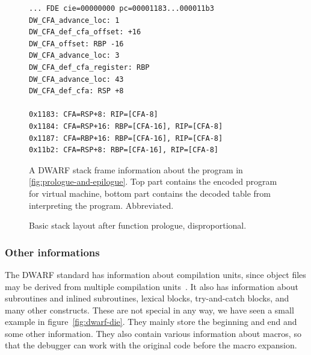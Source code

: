 \begin{figure}
    \begin{lstlisting}
... FDE cie=00000000 pc=00001183...000011b3
DW_CFA_advance_loc: 1
DW_CFA_def_cfa_offset: +16
DW_CFA_offset: RBP -16
DW_CFA_advance_loc: 3
DW_CFA_def_cfa_register: RBP
DW_CFA_advance_loc: 43
DW_CFA_def_cfa: RSP +8

0x1183: CFA=RSP+8: RIP=[CFA-8]
0x1184: CFA=RSP+16: RBP=[CFA-16], RIP=[CFA-8]
0x1187: CFA=RBP+16: RBP=[CFA-16], RIP=[CFA-8]
0x11b2: CFA=RSP+8: RBP=[CFA-16], RIP=[CFA-8]
    \end{lstlisting}
    \caption{A DWARF stack frame information about the program in
             \ref{fig:prologue-and-epilogue}. Top part contains the encoded
             program for virtual machine, bottom part contains the decoded
             table from interpreting the program. Abbreviated.}
    \label{fig:dwarf-stack-frames}
\end{figure}

\begin{figure}
    \centering
    \caption{Basic stack layout after function prologue, disproportional.}
    \label{fig:stack-layout}
\end{figure}

\subsubsection{Other informations}
The DWARF standard has information about compilation units, since object files
may be derived from multiple compilation units~\cite{dwarf}. It also has
information about subroutines and inlined subroutines, lexical blocks,
try-and-catch blocks, and many other constructs. These are not special in any
way, we have seen a small example in figure~\ref{fig:dwarf-die}. They mainly
store the beginning and end and some other information. They also contain
various information about macros, so that the debugger can work with the
original code before the macro expansion.

